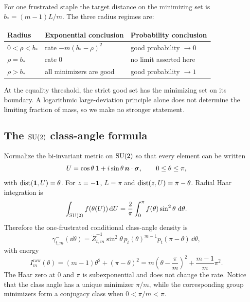 For one frustrated staple the target distance on the minimizing set is
$b_*=(m-1)L/m$.  The three radius regimes are:
\begin{center}
\begin{tabular}{@{}lll@{}}
\toprule
Radius & Exponential conclusion & Probability conclusion \\
\midrule
$0<\rho<b_*$ & rate $-m(b_*-\rho)^2$ & good probability $\to0$ \\
$\rho=b_*$ & rate $0$ & no limit asserted here \\
$\rho>b_*$ & all minimizers are good & good probability $\to1$ \\
\bottomrule
\end{tabular}
\end{center}
At the equality threshold, the strict good set has the minimizing set on its
boundary.  A logarithmic large-deviation principle alone does not determine
the limiting fraction of mass, so we make no stronger statement.

\subsection{The \texorpdfstring{$\mathrm{SU}(2)$}{SU(2)} class-angle formula}

Normalize the bi-invariant metric on $\mathrm{SU}(2)$ so that every element can be
written
\[
 U=\cos\theta\,\mathbf 1+i\sin\theta\,\boldsymbol n\cdot\boldsymbol\sigma,
 \qquad 0\leq\theta\leq\pi,
\]
with $\operatorname{dist}(\mathbf 1,U)=\theta$.  For $z=-\mathbf 1$, $L=\pi$ and
$\operatorname{dist}(z,U)=\pi-\theta$.  Radial Haar integration is
\begin{equation}\label{eq:radial-haar}
 \int_{\mathrm{SU}(2)}f(\theta(U))\,\mathrm dU
 =\frac2\pi\int_0^\pi f(\theta)\sin^2\theta\,\,\mathrm d\theta.
\end{equation}
Therefore the one-frustrated conditional class-angle density is
\begin{equation}\label{eq:su2-radial-density}
 \gamma_{t,m}^{-}(\dd\theta)
 =\widetilde Z_{t,m}^{-1}\sin^2\theta\,
 p_t(\theta)^{m-1}p_t(\pi-\theta)\,\dd\theta,
\end{equation}
with energy
\begin{equation}\label{eq:su2-rate}
 I_m^{\mathrm{raw}}(\theta)
 =(m-1)\theta^2+(\pi-\theta)^2
 =m\left(\theta-\frac\pi m\right)^2
  +\frac{m-1}{m}\pi^2.
\end{equation}
The Haar zero at $0$ and $\pi$ is subexponential and does not change the
rate.  Notice that the class angle has a unique minimizer $\pi/m$, while the
corresponding group minimizers form a conjugacy class when $0<\pi/m<\pi$.

